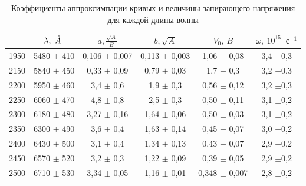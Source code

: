 \documentclass[a4paper,12pt]{article}
\renewcommand{\AA}{\ensuremath{\mathring{A}}}
\begin{document}
\begin{enumerate}
\begin{table}[h!]

\centering
\caption{Коэффициенты аппроксимпации кривых и величины запирающего напряжения для каждой длины волны}
\begin{tabular}{|
>{\columncolor[HTML]{FFFFFF}}c |
>{\columncolor[HTML]{FFFFFF}}c |
>{\columncolor[HTML]{FFFFFF}}c |
>{\columncolor[HTML]{FFFFFF}}c |
>{\columncolor[HTML]{FFFFFF}}c |
>{\columncolor[HTML]{FFFFFF}}c |}

\hline

{$\alpha, ^0$} & {$\lambda,~\text{\AA}\ $} & $a, \frac{\sqrt{A}}{B}$ & $b, \sqrt{A}$ & \textbf{$V_0,~ B$} & $\omega,~10^{15}~\text{ с}^{-1}$\\ \hline






1950           & 5480 $\pm$   410        & 0,106  $\pm$  0,007   & 0,113 $\pm$  0,003    & 1,06  $\pm$    0,08   & 3,4 $\pm$0,3\\ \hline

2150           & 5840  $\pm$   450       & 0,33 $\pm$  0,09    & 0,79 $\pm$  0,03    & 1,7 $\pm$    0,3   & 3,2 $\pm$0,3\\ \hline

2200           & 5950  $\pm$   460       & 3,4 $\pm$  0,6    & 1,9 $\pm$  0,3    & 0,56 $\pm$    0,12   & 3,2 $\pm$0,3\\ \hline

2250           & 6060  $\pm$   470       & 4,8 $\pm$  0,8    & 2,5 $\pm$    0,3  & 0,50 $\pm$     0,11   & 3,1 $\pm$0,2\\ \hline

2300           & 6180  $\pm$    480      & 3,27 $\pm$  0,16    & 1,64 $\pm$   0,06   & 0,50 $\pm$   0,03     & 3,1 $\pm$0,2\\ \hline

2350           & 6300 $\pm$    490       & 3,6 $\pm$   0,4   & 1,63  $\pm$   0,14  & 0,45 $\pm$     0,07   & 3,0 $\pm$0,2\\ \hline

2400           & 6430 $\pm$    500       & 3,1 $\pm$  0,4    & 1,34  $\pm$   0,13  & 0,43 $\pm$    0,07   & 2,9 $\pm$0,2\\ \hline
2450           & 6570 $\pm$   520        & 3,2 $\pm$  0,3    & 1,22   $\pm$  0,09  & 0,39  $\pm$  0,05  &   2,9 $\pm$0,2\\ \hline

2500           & 6710   $\pm$    530     & 3,34 $\pm$  0,05    & 1,16  $\pm$ 0,01    & 0,348   $\pm$  0,007 &  2,8 $\pm$0,2\\ \hline








\end{tabular}
\label{table a,b,V}
\end{table}

\end{enumerate}
\newpage
\end{document}
